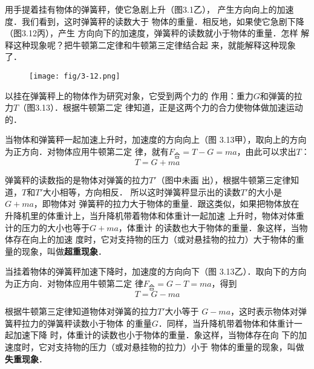     用手提着挂有物体的弹簧秤，使它急剧上升（图3.1乙），
产生方向向上的加速度．我们看到，这时弹簧秤的读数大于
物体的重量．相反地，如果使它急剧下降（图3.12丙），产生
方向向下的加速度，弹簧秤的读数就小于物体的重量．怎样
解释这种现象呢？把牛顿第二定律和牛顿第三定律结合起
来，就能解释这种现象了．
\begin{figure}[htp]\centering
\texttt{[image: fig/3-12.png]}
\caption{}
\end{figure}

    以挂在弹簧秤上的物体作为研究对象，它受到两个力的
作用：重力$G$和弹簧的拉力$T$（图3.13）．根据牛顿第二定
律知道，正是这两个力的合力使物体做加速运动的．

\begin{figure}[htp]\centering
{}
\caption{}
\end{figure}

    当物体和弹簧秤一起加速上升时，加速度的方向向上（图
3.13甲），取向上的方向为正方向．对物体应用牛顿第二定
律，就有$F_{\text{合}}=T-G=ma$，由此可以求出$T$：
\[ T=G+ma\]

    弹簧秤的读数指的是物体对弹簧的拉力$T'$（图中未画
出），根据牛顿第三定律知道，$T$和$T'$大小相等，方向相反．
所以这时弹簧秤显示出的读数$T'$的大小是$G+ma$，即物体对
弹簧秤的拉力大于物体的重量．跟这类似，如果把物体放在
升降机里的体重计上，当升降机带着物体和体重计一起加速
上升时，物体对体重计的压力的大小也等于$G+ma$，体重计
的读数也大于物体的重量．象这样，当物体存在向上的加速
度时，它对支持物的压力（或对悬挂物的拉力）大于物体的重
量的现象，叫做\textbf{超重现象}．

    当挂着物体的弹簧秤加速下降时，加速度的方向向下（图
3.13乙）．取向下的方向为正方向．对物体应用牛顿第二定
律$F_{\text{合}}=G-T=ma$，得到
                               \[T=G-ma\]
    
根据牛顿第三定律知道物体对弹簧的拉力$T'$大小等于
$G-ma$，这时表示物体对弹簧秤拉力的弹簧秤读数小于物体
的重量$G$．同样，当升降机带着物体和体重计一起加速下降
时，体重计的读数也小于物体的重量．象这样，当物体存在向
下的加速度时，它对支持物的压力（或对悬挂物的拉力）小于
物体的重量的现象，叫做\textbf{失重现象}．

